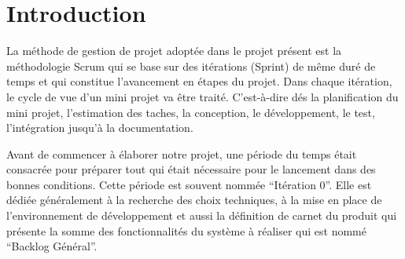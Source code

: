 \chapter*{Introduction}

La méthode de gestion de projet adoptée dans le projet présent est la
méthodologie Scrum qui se base sur des itérations (Sprint) de même duré de
temps et qui constitue l'avancement en étapes du projet. Dans chaque itération,
le cycle de vue d'un mini projet va être traité. C'est-à-dire dés la
planification du mini projet, l'estimation des taches, la conception, le
développement, le test, l'intégration jusqu'à la documentation.

Avant de commencer à élaborer notre projet, une période du temps était
consacrée pour préparer tout qui était nécessaire pour le lancement dans des
bonnes conditions. Cette période est souvent nommée ``Itération 0''. Elle est
dédiée généralement à la recherche des choix techniques, à la mise en place de
l'environnement de développement et aussi la définition de carnet du produit
qui présente la somme des fonctionnalités du système à réaliser qui est nommé
``Backlog Général''.
